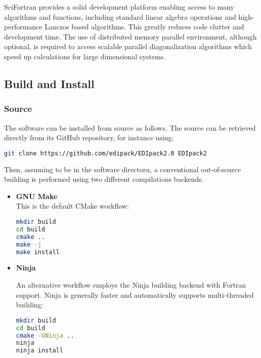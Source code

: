 \documentclass[final,3p,10pt]{elsarticle}
\begin{document}
SciFortran provides a solid development platform enabling access to
many algorithms and functions, including standard linear algebra
operations and high-performance Lanczos based algorithms. This
greatly reduces code clutter and development time.
The use of distributed memory parallel environment, although optional,
is required to access scalable parallel diagonalization algorithms
which speed up calculations for large dimensional systems. 

\subsection{Build and Install}
\subsubsection{Source}
The software can be installed from source as follows. The source can
be retrieved directly from its GitHub repository, for instance using:
\begin{lstlisting}[language=Bash]
git clone https://github.com/edipack/EDIpack2.0 EDIpack2
\end{lstlisting}
Then, assuming to be in the software directoru, a conventional
out-of-source building is performed using two different compilations
backends.

\begin{itemize}
  \item {\bf GNU Make}\\
This is the default CMake workflow:
\begin{lstlisting}[language=Bash]
mkdir build
cd build
cmake ..
make -j
make install
\end{lstlisting}


\item{\bf Ninja}

An alternative workflow employs the Ninja building backend with
Fortran support. Ninja is generally faster and automatically supports
multi-threaded building:
\begin{lstlisting}[language=Bash]
mkdir build
cd build
cmake -GNinja ..
ninja
ninja install
\end{lstlisting}
\end{itemize}
\end{document}
